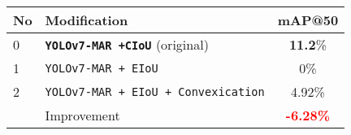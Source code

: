   \begin{tabular}{ l l c }
    \toprule[1.5pt]
    No & Modification        &mAP@50 \\
    \midrule
    0  & \texttt{\textbf{YOLOv7-MAR +CIoU}} (original)     & \textbf{11.2}\%\\
    1  & \texttt{YOLOv7-MAR + EIoU}                & 0\%\\
    2  & \texttt{YOLOv7-MAR + EIoU + Convexication} & 4.92\%\\
    \midrule
       & Improvement                                & \textbf{\textcolor{red}{-6.28\%}}\\
    \bottomrule[1.5pt]
  \end{tabular}